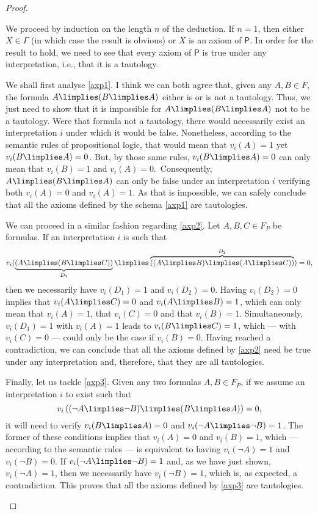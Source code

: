 \begin{proof}
\begin{parlist}
\item We proceed by induction on the length $n$ of the deduction.
If $n = 1$, then either $X \in \Gamma$ (in which case the result is obvious) or $X$ is an axiom of $\mathsf{P}$.
In order for the result to hold, we need to see that every axiom of $\mathsf{P}$ is true under any interpretation, i.e., that it is a tautology.

We shall first analyse \ref{axp1}.
I think we can both agree that, given any $A,B\in F$, the formula $A\limplies (B\limplies A)$ either is or is not a tautology.
Thus, we just need to show that it is impossible for $A\limplies (B\limplies A)$ not to be a tautology.
Were that formula not a tautology, there would necessarily exist an interpretation $i$ under which it would be false.
Nonetheless, according to the semantic rules of propositional logic, that would mean that $v_i(A) = 1$ yet $v_i(B\limplies A) = 0$.
But, by those same rules, $v_i(B\limplies A) = 0$ can only mean that $v_i(B) = 1$ and $v_i(A) = 0$.\
Consequently, $A\limplies (B\limplies A)$ can only be false under an interpretation $i$ verifying both $v_i(A) = 0$ and $v_i(A) = 1$.
As that is impossible, we can safely conclude that all the axioms defined by the schema \ref{axp1} are tautologies.

We can proceed in a similar fashion regarding \ref{axp2}.
Let $A,B,C\in F_P$ be formulas.
If an interpretation $i$ is such that
\[ v_i( \underbrace{(A\limplies(B\limplies C))}_{D_1} \limplies \overbrace{((A\limplies B) \limplies (A\limplies C))}^{D_2}) = 0,\]
then we necessarily have $v_i(D_1) = 1$ and $v_i(D_2) = 0$.
Having $v_i(D_2) = 0$ implies that $v_i(A\limplies C) = 0$ and $v_i(A\limplies B) = 1$, which can only mean that $v_i(A) = 1$, that $v_i(C) = 0$ and that $v_i(B) = 1$.
Simultaneously, $v_i(D_1) = 1$ with $v_i(A) = 1$ leads to $v_i(B\limplies C) = 1$, which --- with $v_i(C) = 0$ --- could only be the case if $v_i(B) = 0$.
Having reached a contradiction, we can conclude that all the axioms defined by \ref{axp2} need be true under any interpretation and, therefore, that they are all tautologies.

Finally, let us tackle \ref{axp3}. Given any two formulas $A,B\in F_P$, if we assume an interpretation $i$ to exist such that
\[ v_i\left( (\lnot A \limplies \lnot B) \limplies (B \limplies A) \right) = 0,\]
it will need to verify $v_i(B \limplies A) = 0$ and $v_i(\lnot A\limplies \lnot B) = 1$.
The former of these conditions implies that $v_i(A) = 0$ and $v_i(B) = 1$, which --- according to the semantic rules --- is equivalent to having $v_i(\lnot A) = 1$ and $v_i(\lnot B) = 0$. If $v_i(\lnot A\limplies \lnot B) = 1$ and, as we have just shown, $v_i(\lnot A) = 1$, then we necessarily have $v_i(\lnot B) = 1$, which is, as expected, a contradiction.
This proves that all the axioms defined by \ref{axp3} are tautologies.


\end{parlist}
\end{proof}
